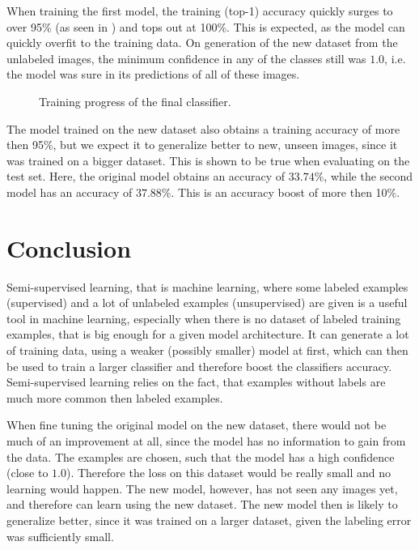 \documentclass[a4paper,onecolumn,oneside,11pt,english,bibliography=totoc]{article}
\newcommand{\1}{\mathds{1}}
\theoremstyle{breakit}
\theoremstyle{break}
\begin{document}
	When training the first model, the training (top-1) accuracy quickly surges to over 95\% (as seen in ) and tops out at 100\%. This is expected, as the model can quickly overfit to the training data. On generation of the new dataset from the unlabeled images, the minimum confidence in any of the classes still was $1.0$, i.e. the model was sure in its predictions of all of these images.
	
	\begin{figure}[h]
	    \centering
	    \resizebox{\textwidth}{!}{}
	    \caption{Training progress of the final classifier.}
	    \label{fig:training_classifier}
	\end{figure}
	
	The model trained on the new dataset also obtains a training accuracy of more then 95\%, but we expect it to generalize better to new, unseen images, since it was trained on a bigger dataset.
	This is shown to be true when evaluating on the test set. Here, the original model obtains an accuracy of $33.74\%$, while the second model has an accuracy of $37.88\%$. This is an accuracy boost of more then 10\%.
	
	\section*{Conclusion}
	Semi-supervised learning, that is machine learning, where some labeled examples (supervised) and a lot of unlabeled examples (unsupervised) are given is a useful tool in machine learning, especially when there is no dataset of labeled training examples, that is big enough for a given model architecture. It can generate a lot of training data, using a weaker (possibly smaller) model at  first, which can then be used to train a larger classifier and therefore boost the classifiers accuracy. Semi-supervised learning relies on the fact, that examples without labels are much more common then labeled examples.
	
	When fine tuning the original model on the new dataset, there would not be much of an improvement at all, since the model has no information to gain from the data. The examples are chosen, such that the model has a high confidence (close to $1.0$). Therefore the loss on this dataset would be really small and no learning would happen. The new model, however, has not seen any images yet, and therefore can learn using the new dataset. The new model then is likely to generalize better, since it was trained on a larger dataset, given the labeling error was sufficiently small.
	
\end{document}
